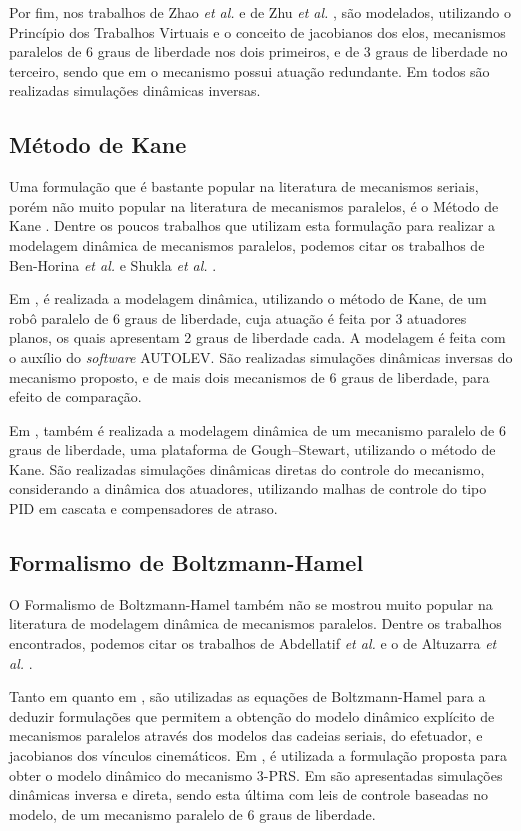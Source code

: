 \documentclass[]{politex}
\begin{document}
Por fim, nos trabalhos de Zhao \emph{et al.} \cite{Zhao, Zhao2} e de Zhu \emph{et al.} \cite{Zhu}, são modelados, utilizando o Princípio dos Trabalhos Virtuais e o conceito de jacobianos dos elos, mecanismos paralelos de 6 graus de liberdade nos dois primeiros, e de 3 graus de liberdade no terceiro, sendo que em \cite{Zhao2} o mecanismo possui atuação redundante. Em todos são realizadas simulações dinâmicas inversas.

\subsection{Método de Kane}

Uma formulação que é bastante popular na literatura de mecanismos seriais, porém não muito popular na literatura de mecanismos paralelos, é o Método de Kane \cite{Kane}. Dentre os poucos trabalhos que utilizam esta formulação para realizar a modelagem dinâmica de mecanismos paralelos, podemos citar os trabalhos de Ben-Horina \emph{et al.} \cite{BenHorina} e Shukla \emph{et al.} \cite{Shukla}.

Em \cite{BenHorina}, é realizada a modelagem dinâmica, utilizando o método de Kane, de um robô paralelo de 6 graus de liberdade, cuja atuação é feita por 3 atuadores planos, os quais apresentam 2 graus de liberdade cada. A modelagem é feita com o auxílio do \emph{software} AUTOLEV. São realizadas simulações dinâmicas inversas do mecanismo proposto, e de mais dois mecanismos de 6 graus de liberdade, para efeito de comparação.

Em \cite{Shukla}, também é realizada a modelagem dinâmica de um mecanismo paralelo de 6 graus de liberdade, uma plataforma de Gough–Stewart, utilizando o método de Kane. São realizadas simulações dinâmicas diretas do controle do mecanismo, considerando a dinâmica dos atuadores, utilizando malhas de controle do tipo PID em cascata e compensadores de atraso.

\subsection{Formalismo de Boltzmann-Hamel}

O Formalismo de Boltzmann-Hamel \cite{Jarzebowska} também não se mostrou muito popular na literatura de modelagem dinâmica de mecanismos paralelos. Dentre os trabalhos encontrados, podemos citar os trabalhos de Abdellatif \emph{et al.} \cite{Abdellatif2} e o de Altuzarra \emph{et al.} \cite{20altuzarra}.

Tanto em \cite{Abdellatif2} quanto em \cite{20altuzarra}, são utilizadas as equações de Boltzmann-Hamel para a deduzir formulações que permitem a obtenção do modelo dinâmico explícito de mecanismos paralelos através dos modelos das cadeias seriais, do efetuador, e jacobianos dos vínculos cinemáticos. Em \cite{20altuzarra}, é utilizada a formulação proposta para obter o modelo dinâmico do mecanismo 3-PRS. Em \cite{Abdellatif2} são apresentadas simulações dinâmicas inversa e direta, sendo esta última com leis de controle baseadas no modelo, de um mecanismo paralelo de 6 graus de liberdade.
\end{document}
